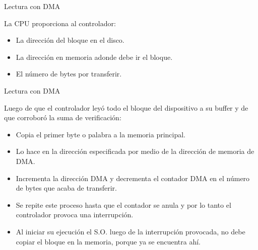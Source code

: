 \documentclass{beamer}
\begin{document}
\begin{frame}{Lectura con DMA}
        \begin{block}{
            La CPU proporciona al controlador:
            \pause 
        }
        \begin{itemize}
            \item {
                La dirección del bloque en el disco.
                \pause
            }
            \item {
                La dirección en memoria adonde debe ir el bloque.
                \pause
            }
            \item {
                 El número de bytes por transferir.
            }
        \end{itemize}
        \end{block}
        
        
\end{frame}

\begin{frame}{Lectura con DMA}
    
        \begin{block}{
            Luego de que el controlador leyó todo el bloque del dispositivo a su buffer y de que corroboró la suma de verificación:
            \pause
        }
        \begin{itemize}
            \item {
                Copia el primer byte o palabra a la memoria principal.
                \pause
            }
            \item {
                 Lo hace en la dirección especificada por medio de la dirección de memoria de DMA.
                \pause
            }
            \item {
                 Incrementa la dirección DMA y decrementa el contador DMA en el número de bytes que acaba de transferir.
                \pause
            }
            \item {
                Se repite este proceso hasta que el contador se anula y por lo tanto el controlador provoca una interrupción.
                \pause
            }
            \item {
                 Al iniciar su ejecución el S.O. luego de la interrupción provocada, no debe copiar el bloque en la memoria, porque ya se encuentra ahí.
            }
            
        \end{itemize}
        \end{block}
        
\end{frame}
\end{document}
